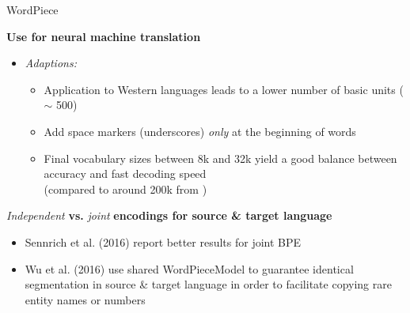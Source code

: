 \documentclass[11pt,compress,t,notes=noshow, xcolor=table]{beamer}
\begin{document}
\begin{frame}{WordPiece}

\vfill

	\textbf{Use for neural machine translation \href{https://arxiv.org/pdf/1609.08144.pdf}{}}

	\begin{itemize}
		\item \textit{Adaptions:} 
			\begin{itemize}
				\item Application to Western languages leads to a lower number of basic units ($\sim$ 500)
				\item Add space markers (underscores) \textit{only} at the beginning of words
				\item Final vocabulary sizes between 8k and 32k yield a good balance between accuracy and fast decoding speed\\(compared to around 200k from \href{https://storage.googleapis.com/pub-tools-public-publication-data/pdf/37842.pdf}{})
			\end{itemize}
	\end{itemize}
	
	\vspace{.3cm}
	
	\textit{Independent} \textbf{vs.} \textit{joint} \textbf{encodings for source \& target language}
	
	\begin{itemize}
		\item Sennrich et al. (2016) report better results for joint BPE
		\item Wu et al. (2016) use shared WordPieceModel to guarantee identical segmentation in source \& target language in order to facilitate copying rare entity names or numbers
	\end{itemize}
	
\vfill

\end{frame}


\endlecture
\end{document}
